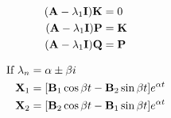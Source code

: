 \documentclass[12pt]{article}
\begin{document}
\begin{multicols}{2}

  \begin{equation*}
    \begin{split}
      (\bold{A}-\lambda_1\bold{I})\bold{K}&=0\\
      (\bold{A}-\lambda_1\bold{I})\bold{P}&=\bold{K}\\
      (\bold{A}-\lambda_1\bold{I})\bold{Q}&=\bold{P}\\
    \end{split}
    \label{5}
  \end{equation*}

  \begin{equation*}
    \begin{split}
      \text{If }\lambda_n&=\alpha\pm\beta i\\
      \bold{X}_1&=[\bold{B}_1\cos\beta t-\bold{B}_2\sin\beta t]e^{\alpha t}\\
      \bold{X}_2&=[\bold{B}_2\cos\beta t-\bold{B}_1\sin\beta t]e^{\alpha t}\\
    \end{split}
    \label{6}
  \end{equation*}

\end{multicols}

\begin{multicols}{2}

  \begin{equation*}
    \begin{split}
    \end{split}
    \label{7}
  \end{equation*}

  \begin{equation*}
    \begin{split}
    \end{split}
    \label{8}
  \end{equation*}


\end{multicols}

\begin{multicols}{2}

  \begin{equation*}
    \begin{split}
    \end{split}
    \label{9}
  \end{equation*}

  \begin{equation*}
    \begin{split}
    \end{split}
    \label{10}
  \end{equation*}

\end{multicols}
\end{document}
